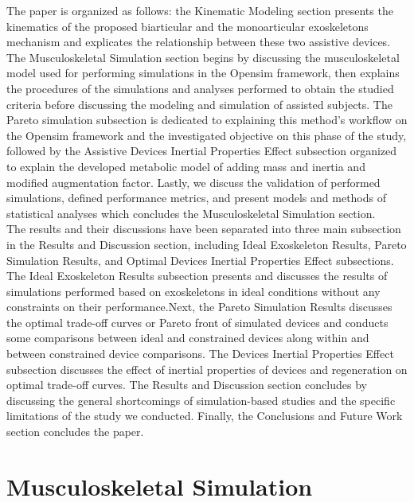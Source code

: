 \documentclass[10pt,letterpaper]{article}
\begin{document}
The paper is organized as follows: the Kinematic Modeling section presents the kinematics of the proposed biarticular and the monoarticular exoskeletons mechanism and explicates the relationship between these two assistive devices. The Musculoskeletal Simulation section begins by discussing the musculoskeletal model used for performing simulations in the Opensim framework, then explains the procedures of the simulations and analyses performed to obtain the studied criteria before discussing the modeling and simulation of assisted subjects. The Pareto simulation subsection is dedicated to explaining this method's workflow on the Opensim framework and the investigated objective on this phase of the study, followed by the Assistive Devices Inertial Properties Effect subsection organized to explain the developed metabolic model of adding mass and inertia and modified augmentation factor. Lastly, we discuss the validation of performed simulations, defined performance metrics, and present models and methods of statistical analyses which concludes the Musculoskeletal Simulation section.\\
The results and their discussions have been separated into three main subsection in the Results and Discussion section, including Ideal Exoskeleton Results, Pareto Simulation Results, and Optimal Devices Inertial Properties Effect subsections. The Ideal Exoskeleton Results subsection presents and discusses the results of simulations performed based on exoskeletons in ideal conditions without any constraints on their performance.Next, the Pareto Simulation Results discusses the optimal trade-off curves or Pareto front of simulated devices and conducts some comparisons between ideal and constrained devices along within and between constrained device comparisons. The Devices Inertial Properties Effect subsection discusses the effect of  inertial properties of devices and regeneration on optimal trade-off curves. The Results and Discussion section concludes by discussing the general shortcomings of simulation-based studies and the specific limitations of the study we conducted. Finally, the Conclusions and Future Work section concludes the paper.

\section*{Musculoskeletal Simulation}
\end{document}
